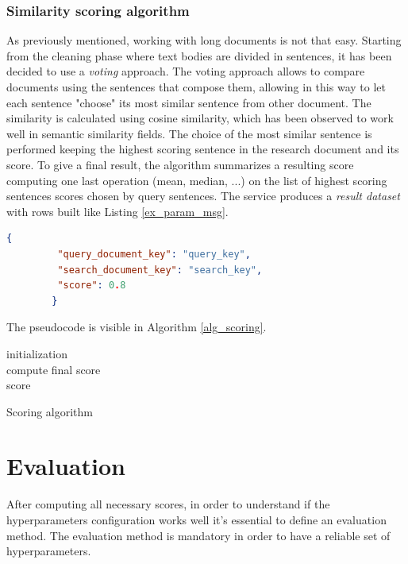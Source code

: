 \documentclass[\main/main.tex]{subfiles}
\begin{document}
\subsubsection{Similarity scoring algorithm}
As previously mentioned, working with long documents is not that easy. Starting from the cleaning phase where text bodies are divided in sentences, it has been decided to use a \emph{voting} approach. The voting approach allows to compare documents using the sentences that compose them, allowing in this way to let each sentence "choose" its most similar sentence from other document. The similarity is calculated using cosine similarity, which has been observed to work well in semantic similarity fields. The choice of the most similar sentence is performed keeping the highest scoring sentence in the research document and its score. To give a final result, the algorithm summarizes a resulting score computing one last operation (mean, median, ...) on the list of highest scoring sentences scores chosen by query sentences. The service produces a \emph{result dataset} with rows built like Listing \ref{ex_param_msg}.
\\
\begin{center}
    \begin{lstlisting}[language=json, caption="Parameter message example", captionpos=b, label={ex_param_msg}]
        {
         "query_document_key": "query_key",
         "search_document_key": "search_key",
         "score": 0.8
        }
    \end{lstlisting}
\end{center}
The pseudocode is visible in Algorithm \ref{alg_scoring}.
\begin{center}
    \begin{algorithm}[H]
     initialization\\
     compute final score\\
     \Return score
     \caption{Scoring algorithm}
     \label{alg_scoring}
    \end{algorithm}
\end{center}

\section{Evaluation}
After computing all necessary scores, in order to understand if the hyperparameters configuration works well it's essential to define an evaluation method. The evaluation method is mandatory in order to have a reliable set of hyperparameters. \\
\end{document}
